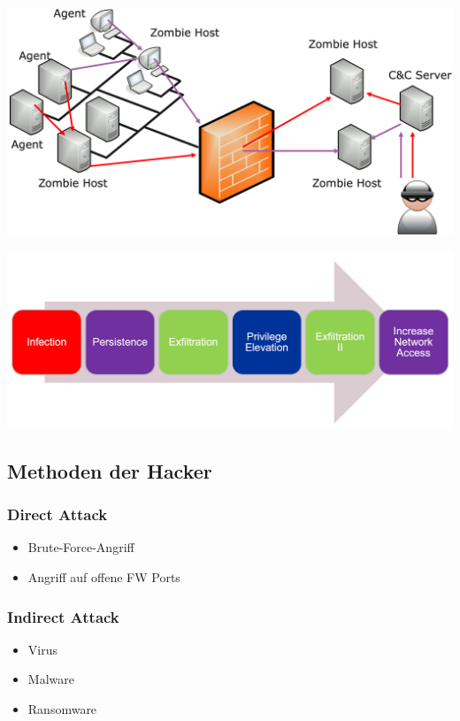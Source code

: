 \begin{center}
    \vspace{-8pt}
    \includegraphics[width=.8\linewidth]{./img/01_cyber-defense/apt_diagram}
    \vspace{-8pt}
\end{center}

\begin{center}
    \vspace{-8pt}
    \includegraphics[width=.8\linewidth]{./img/01_cyber-defense/apt_process}
    \vspace{-8pt}
\end{center}

\subsection{Methoden der Hacker}\label{subsec:methoden-der-hacker}

\subsubsection{Direct Attack}
\begin{itemize}
    \item Brute-Force-Angriff
    \item Angriff auf offene FW Ports
\end{itemize}


\subsubsection{Indirect Attack}
\begin{itemize}
    \item Virus
    \item Malware
    \item Ransomware
\end{itemize}



